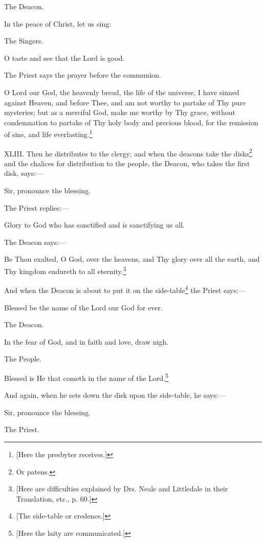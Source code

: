 The Deacon.

In the peace of Christ, let us sing:

The Singers.

O taste and see that the Lord is good.

The Priest says the prayer before the communion.

O Lord our God, the heavenly bread, the life of the universe, I have sinned against Heaven, and before Thee, and am not worthy to partake of Thy pure mysteries; but as a merciful God, make me worthy by Thy grace, without condemnation to partake of Thy holy body and precious blood, for the remission of sins, and life everlasting.\footnote{\par{}  [Here the presbyter receives.]}

XLIII. Then he distributes to the clergy; and when the deacons take the disks\footnote{\par  Or patens.} and the chalices for distribution to the people, the Deacon, who takes the first disk, says:—

Sir, pronounce the blessing.

The Priest replies:—

Glory to God who has sanctified and is sanctifying us all.

The Deacon says:—

Be Thou exalted, O God, over the heavens, and Thy glory over all the earth, and Thy kingdom endureth to all eternity.\footnote{\par{}  [Here are difficulties explained by Drs. Neale and Littledale in their Translation, etc., p. 60.]}

And when the Deacon is about to put it on the side-table\footnote{\par{}  [The side-table or credence.]} the Priest says:—

Blessed be the name of the Lord our God for ever.

The Deacon.

In the fear of God, and in faith and love, draw nigh.

The People.

Blessed is He that cometh in the name of the Lord.\footnote{\par{}  [Here the laity are communicated.]}

And again, when he sets down the disk upon the side-table, he says:—

Sir, pronounce the blessing.

The Priest.

